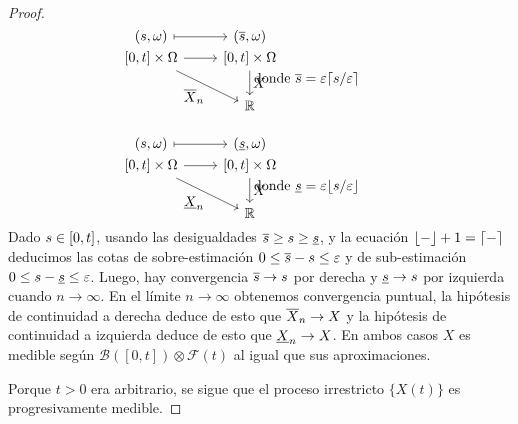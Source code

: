 \documentclass{report}
\newcommand{\leftOpenInterval}{\left]}
\newcommand{\rightOpenInterval}{\right[}
\newcommand{\leftClosedInterval}{\left[}
\newcommand{\rightClosedInterval}{\right]}
\newcommand{\interval}[3]{%
    \ifstrequal{#1}{oo}{%
      \leftOpenInterval #2, #3 \rightOpenInterval%
    }{%
      \ifstrequal{#1}{co}{%
        \leftClosedInterval #2, #3 \rightOpenInterval%
      }{%
        \ifstrequal{#1}{oc}{
          \leftOpenInterval #2, #3 \rightClosedInterval%
        }{%
          \ifstrequal{#1}{cc}{
            \leftClosedInterval #2, #3 \rightClosedInterval
          }{%
          }%
        }%
      }%
    }%
  }
\newcommand{\events}{\mathcal{F}}
\newcommand{\borel}{\mathscr{B}}
\newcommand{\placeholderParameter}{-}
\newcommand{\realNumbers}{\mathbb{R}}
\DeclarePairedDelimiter{\ceil}{\lceil}{\rceil}
\DeclarePairedDelimiter{\floor}{\lfloor}{\rfloor}
\theoremstyle{plain}
\theoremstyle{remark}
\theoremstyle{definition}
\begin{document}
\begin{proof}
  \begin{align}
    &\begin{tikzcd}
      [
        ampersand replacement=\&,
        execute at begin picture={
          \useasboundingbox (-1,-0.7) rectangle (1,1.3);
        }
      ]
      (s, \omega) 
      \arrow[r, mapsto]
        \& (\backPropagation{s}, \omega)
      \\[-2em]
      \interval{cc}{0}{t} \times \Omega
      \arrow{r}
      \arrow{rd}[swap]{\displaystyle \backPropagation{X}_n}
        \& \interval{cc}{0}{t} \times \Omega
          \arrow{d}{\displaystyle X}
      \\
        \&  \realNumbers
      \\
    \end{tikzcd}
    && \text{donde } \backPropagation{s} = \varepsilon \ceil{s / \varepsilon}
    \\\nonumber\\
    &\begin{tikzcd}
      [
        ampersand replacement=\&,
        execute at begin picture={
          \useasboundingbox (-1,-0.7) rectangle (1,1.3);
        }
      ]
      (s, \omega) 
      \arrow[r, mapsto]
        \& (\forwardPropagation{s}, \omega)
      \\[-2em]
      \interval{cc}{0}{t} \times \Omega
      \arrow{r}
      \arrow{rd}[swap]{\displaystyle \forwardPropagation{X}_n}
        \& \interval{cc}{0}{t} \times \Omega
          \arrow{d}{\displaystyle X}
      \\
        \&  \realNumbers
      \\
    \end{tikzcd}
    && \text{donde } \forwardPropagation{s} = \varepsilon \floor{s / \varepsilon}
  \end{align}
  Dado \(s \in \interval{cc}{0}{t}\), usando las desigualdades \(\overline{s} \geq s \geq \underline{s}\), y la ecuación \(\floor{\placeholderParameter} + 1 = \ceil{\placeholderParameter}\) deducimos las cotas de sobre-estimación \(0 \leq \overline{s} - s \leq \varepsilon\) y de sub-estimación \(0 \leq s - \underline{s} \leq \varepsilon\).
  Luego, hay convergencia \(\overline{s} \rightarrow s\) por derecha y \(\underline{s} \rightarrow s\) por izquierda cuando \(n \rightarrow \infty\).
  En el límite \(n \rightarrow \infty\) obtenemos convergencia puntual, la hipótesis de continuidad a derecha deduce de esto que \(\overline{X}_n \rightarrow X\) y la hipótesis de continuidad a izquierda deduce de esto que \(\underline{X}_n \rightarrow X\).
  En ambos casos \(X\) es medible según \(\borel([0, t]) \otimes \events(t)\) al igual que sus aproximaciones.

  Porque \(t > 0\) era arbitrario, se sigue que el proceso irrestricto \(\{X(t)\}\) es progresivamente medible.
\end{proof}
\end{document}
